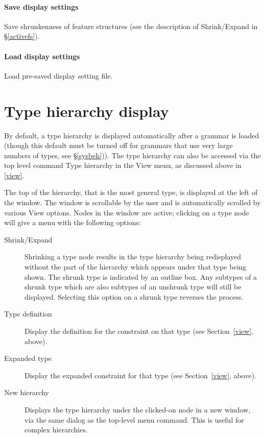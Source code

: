 \documentclass[12pt]{report}
\newcommand{\lkbmenucommand}{{\bf}}
\begin{document}
\paragraph{Save display settings} Save shrunkenness of feature structures
(see the description
of {\lkbmenucommand Shrink/Expand} in \S\ref{activefs}).

\paragraph{Load display settings} Load pre-saved display setting file.


\section{Type hierarchy display}
\label{thier}

By default, a type hierarchy
is displayed automatically after a grammar is loaded 
(though this default must be turned off for grammars that use very
large numbers of types, see \S\ref{sysbeh})).
The type hierarchy
can also be accessed via the top level command {\lkbmenucommand Type hierarchy}
in the {\lkbmenucommand View} menu, as discussed above in \ref{view}.

The top of the hierarchy, that is the most
general type, is displayed at the left of the window.  The window is
scrollable by the user and is automatically scrolled by various {\lkbmenucommand
View} options.  Nodes in the window are active; clicking on a type
node will give a menu with the following options:
\begin{description}
\item[Shrink/Expand] Shrinking a type node results in the type
hierarchy being redisplayed without the part of the hierarchy which
appears under that type being shown.  The shrunk type is indicated by
an outline box.  Any subtypes of a shrunk type which are also subtypes
of an unshrunk type will still be displayed.  Selecting this option on
a shrunk type reverses the process.
\item[Type definition] 
Display the definition for the constraint on that 
type (see Section~\ref{view},
above).
\item[Expanded type]
Display the expanded constraint for that type (see
Section~\ref{view}, above).
\item[New hierarchy]
Displays the type hierarchy under the clicked-on node in a new
window, via the same dialog as the top-level menu command.
This is useful for complex hierarchies.
\end{description}
\end{document}
